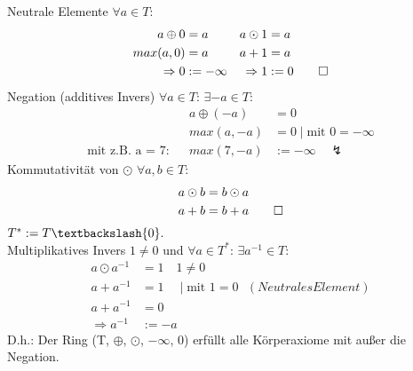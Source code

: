 \documentclass[titlepage]{article}
\begin{document}
	Neutrale Elemente $\forall a\in T$:
	\begin{align*}
		a\oplus 0 &= a		&a\odot 1 &= a\\
		max(a,0) &= a		&a+1 &= a\\
		\Rightarrow 0 &:= -\infty	&\Rightarrow 1 &:= 0 \qed
	\end{align*}
	Negation (additives Invers) $\forall a\in T$: $\exists-a \in T:$
	\begin{align*}
		&& a\oplus(-a) &= 0\\
		&& max(a,-a) &= 0 \mid \text{mit $0 = -\infty$}\\
		\text{mit z.B. a = 7:}&& max(7,-a) &:= -\infty \quad \lightning
	\end{align*}
	Kommutativität von $\odot$ $\forall a,b\in T$:
	\begin{align*}
		a\odot b &= b\odot a\\
		a+b &= b+a \qed
	\end{align*}
	$T^*:=T\textbackslash \{0\}.$\\
	Multiplikatives Invers $1\neq0$ und $\forall a\in T^*$: $\exists a^{-1} \in T:$
	\begin{align*}
		a\odot a^{-1} &= 1 \quad 1\neq 0\\
		a+a^{-1} &= 1 \quad\mid \text{mit $1=0$ } (Neutrales Element)\\
		a+a^{-1} &= 0\\
		\Rightarrow a^{-1} &:= -a 
	\end{align*}
	D.h.: Der Ring (T, $\oplus$, $\odot$, $-\infty$, 0) erfüllt alle Körperaxiome mit außer die Negation.
\end{document}
